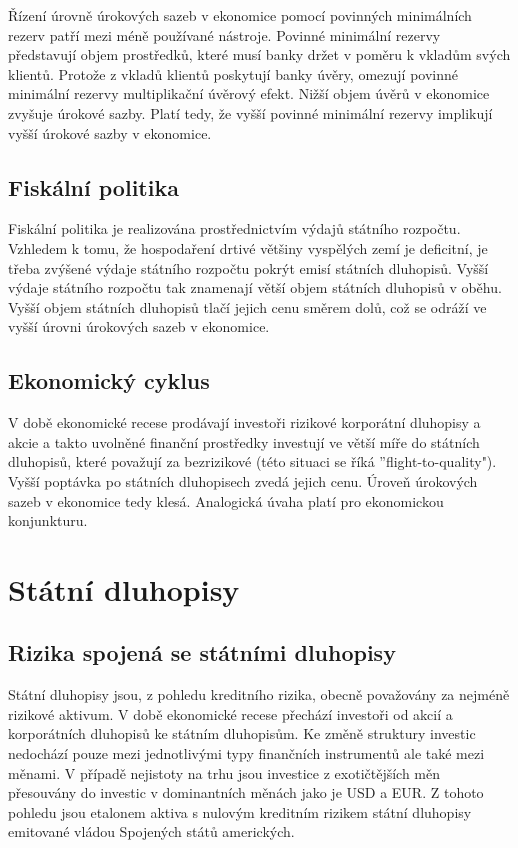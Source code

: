 \documentclass[a4paper]{book}
\begin{document}
Řízení úrovně úrokových sazeb v ekonomice pomocí povinných minimálních rezerv patří mezi méně používané nástroje. Povinné minimální rezervy představují objem prostředků, které musí banky držet v poměru k vkladům svých klientů. Protože z vkladů klientů poskytují banky úvěry, omezují povinné minimální rezervy multiplikační úvěrový efekt. Nižší objem úvěrů v ekonomice zvyšuje úrokové sazby. Platí tedy, že vyšší povinné minimální rezervy implikují vyšší úrokové sazby v ekonomice.

\subsection{Fiskální politika}

Fiskální politika je realizována prostřednictvím výdajů státního rozpočtu. Vzhledem k tomu, že hospodaření drtivé většiny vyspělých zemí je deficitní, je třeba zvýšené výdaje státního rozpočtu pokrýt emisí státních dluhopisů. Vyšší výdaje státního rozpočtu tak znamenají větší objem státních dluhopisů v oběhu. Vyšší objem státních dluhopisů tlačí jejich cenu směrem dolů, což se odráží ve vyšší úrovni úrokových sazeb v ekonomice.

\subsection{Ekonomický cyklus}

V době ekonomické recese prodávají investoři rizikové korporátní dluhopisy a akcie a takto uvolněné finanční prostředky investují ve větší míře do státních dluhopisů, které považují za bezrizikové (této situaci se říká ''flight-to-quality"). Vyšší poptávka po státních dluhopisech zvedá jejich cenu. Úroveň úrokových sazeb v ekonomice tedy klesá. Analogická úvaha platí pro ekonomickou konjunkturu.

\section{Státní dluhopisy}

\subsection{Rizika spojená se státními dluhopisy}

Státní dluhopisy jsou, z pohledu kreditního rizika, obecně považovány za nejméně rizikové aktivum. V době ekonomické recese přechází investoři od akcií a korporátních dluhopisů ke státním dluhopisům. Ke změně struktury investic nedochází pouze mezi jednotlivými typy finančních instrumentů ale také mezi měnami. V případě nejistoty na trhu jsou investice z exotičtějších měn přesouvány do investic v dominantních měnách jako je USD a EUR. Z tohoto pohledu jsou etalonem aktiva s nulovým kreditním rizikem státní dluhopisy emitované vládou Spojených států amerických. 
\end{document}
